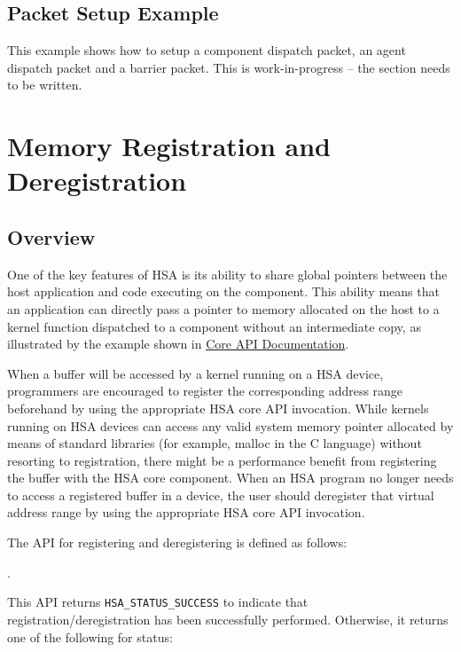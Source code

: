 \documentclass{book}
\begin{document}
\hypertarget{aql_example}{}\subsection{Packet Setup
Example}\label{aql_example}

This example shows how to setup a component dispatch packet, an
agent dispatch packet and a barrier packet.
This is {\color{red} work-in-progress} -- the section needs to be written.

\hypertarget{coreapi_memory_registration}{}\section{Memory Registration and Deregistration}\label{coreapi_memory_registration}
\hypertarget{coreapi_registration_overview}{}\subsection{Overview}\label{coreapi_registration_overview}
One of the key features of H\-S\-A is its ability to share global
pointers between the host application and code executing on the
component. This ability means that an application can directly pass a
pointer to memory allocated on the host to a kernel function
dispatched to a component without an intermediate copy, as illustrated
by the example shown in \hyperlink{coreapi}{Core A\-P\-I
Documentation}.

When a buffer will be accessed by a kernel running on a H\-S\-A
device, programmers are encouraged to register the corresponding
address range beforehand by using the appropriate H\-S\-A core
A\-P\-I invocation. While kernels running on H\-S\-A devices can
access any valid system memory pointer allocated by means of
standard libraries (for example, malloc in the C language) without
resorting to registration, there might be a performance benefit from
registering the buffer with the H\-S\-A core component. When an
H\-S\-A program no longer needs to access a registered buffer in a
device, the user should deregister that virtual address range by
using the appropriate H\-S\-A core A\-P\-I invocation.

The API for registering and deregistering is defined as follows:

.

This API returns \texttt{HSA\_STATUS\_SUCCESS} to indicate that
registration/deregistration has been successfully performed.
Otherwise, it returns one of the following for status:
\end{document}
